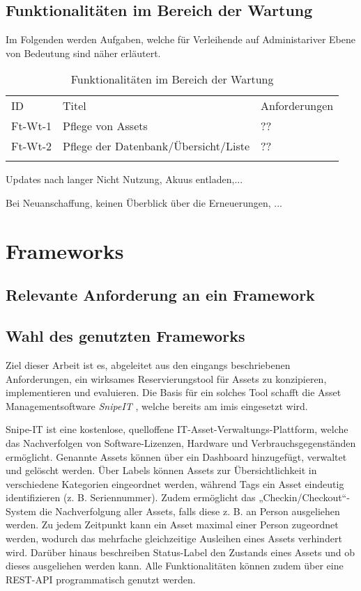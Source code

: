 \subsection{Funktionalitäten im Bereich der Wartung}
\label{subsec:ft-wartung}
Im Folgenden werden Aufgaben, welche für Verleihende auf Administariver Ebene von Bedeutung sind
näher erläutert. 
\begin{table}[h]
    \centering
    \caption{Funktionalitäten im Bereich der Wartung}
    \begin{tabular}{lll}
            \arrayrulecolor{maincolor}\hline
            \sffamily\color{maincolor}ID & \sffamily\color{maincolor}Titel &
            \sffamily\color{maincolor}Anforderungen \\
            \arrayrulecolor{maincolor}\hline
            Ft-Wt-1 & Pflege von Assets                  & ?? \\
            Ft-Wt-2 & Pflege der Datenbank/Übersicht/Liste            & ?? \\
            \arrayrulecolor{maincolor}\hline
    \end{tabular}
    \label{table:Ag-Wt}
\end{table}

Updates nach langer Nicht Nutzung, Akuus entladen,...

Bei Neuanschaffung, keinen Überblick über die Erneuerungen, ...


\section{Frameworks} 

\subsection{Relevante Anforderung an ein Framework}
\subsection{Wahl des genutzten Frameworks}
Ziel dieser Arbeit ist es, abgeleitet aus den eingangs beschriebenen Anforderungen, ein wirksames
Reservierungstool für Assets zu konzipieren, implementieren und evaluieren. Die Basis für ein
solches Tool schafft die Asset Managementsoftware \textit{SnipeIT} \cite{noauthor_home_nodate},
welche bereits am \ac{imis} eingesetzt wird.

Snipe-IT ist eine kostenlose, quelloffene IT-Asset-Verwaltungs-Plattform,
welche das Nachverfolgen von Software-Lizenzen, Hardware und
Verbrauchsgegenständen ermöglicht. Genannte Assets können über ein Dashboard
hinzugefügt, verwaltet und gelöscht werden. Über Labels können Assets zur
Übersichtlichkeit in verschiedene Kategorien eingeordnet werden, während
Tags ein Asset eindeutig identifizieren (z. B. Seriennummer). Zudem ermöglicht
das „Checkin/Checkout“-System die Nachverfolgung aller Assets, falls diese
z. B.  an Person ausgeliehen werden. Zu jedem Zeitpunkt kann ein Asset
maximal einer Person zugeordnet werden, wodurch das mehrfache gleichzeitige
Ausleihen eines Assets verhindert wird. Darüber hinaus beschreiben Status-Label
den Zustands eines Assets und ob dieses ausgeliehen werden kann. Alle
Funktionalitäten können zudem über eine REST-API programmatisch genutzt werden.


